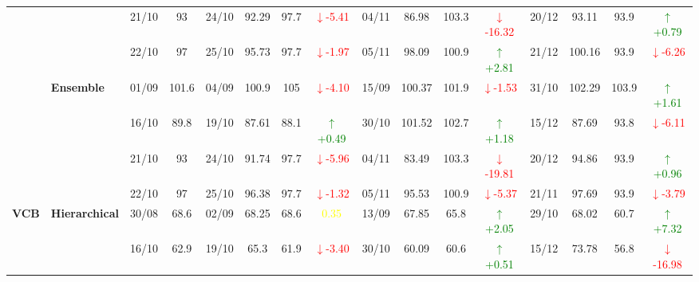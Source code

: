 \documentclass{ieeeaccess}
\begin{document}
{\begin{longtable}{llcc|cccc|cccc|cccc}
&
& 21/10 & 93 & 24/10 & 92.29 & 97.7 & \textcolor{red}{\(\downarrow\)-5.41} & 04/11 & 86.98 & 103.3 & \textcolor{red}{\(\downarrow\)-16.32} & 20/12 & 93.11 & 93.9 & \textcolor{green}{\(\uparrow\)+0.79} \\

&
& 22/10 & 97 & 25/10 & 95.73 & 97.7 & \textcolor{red}{\(\downarrow\)-1.97} & 05/11 & 98.09 & 100.9 & \textcolor{green}{\(\uparrow\)+2.81} & 21/12 & 100.16 & 93.9 & \textcolor{red}{\(\downarrow\)-6.26} \\
\cmidrule(lr){2-16}



& \textbf{Ensemble}
& 01/09 & 101.6 & 04/09 & 100.9 & 105 & \textcolor{red}{\(\downarrow\)-4.10} & 15/09 & 100.37 & 101.9 & \textcolor{red}{\(\downarrow\)-1.53} & 31/10 & 102.29 & 103.9 & \textcolor{green}{\(\uparrow\)+1.61} \\

&
& 16/10 & 89.8 & 19/10 & 87.61 & 88.1 & \textcolor{green}{\(\uparrow\)+0.49} & 30/10 & 101.52 & 102.7 & \textcolor{green}{\(\uparrow\)+1.18} & 15/12 & 87.69 & 93.8 & \textcolor{red}{\(\downarrow\)-6.11} \\

&
& 21/10 & 93 & 24/10 & 91.74 & 97.7 & \textcolor{red}{\(\downarrow\)-5.96} & 04/11 & 83.49 & 103.3 & \textcolor{red}{\(\downarrow\)-19.81} & 20/12 & 94.86 & 93.9 & \textcolor{green}{\(\uparrow\)+0.96} \\

&
& 22/10 & 97 & 25/10 & 96.38 & 97.7 & \textcolor{red}{\(\downarrow\)-1.32} & 05/11 & 95.53 & 100.9 & \textcolor{red}{\(\downarrow\)-5.37} & 21/11 & 97.69 & 93.9 & \textcolor{red}{\(\downarrow\)-3.79} \\
\midrule




\multirow{12}{*}{\textbf{VCB}} 
& \textbf{Hierarchical}
& 30/08 & 68.6 & 02/09 & 68.25 & 68.6 & \textcolor{yellow}{0.35} & 13/09 & 67.85 & 65.8 & \textcolor{green}{\(\uparrow\)+2.05} & 29/10 & 68.02 & 60.7 & \textcolor{green}{\(\uparrow\)+7.32} \\

&
& 16/10 & 62.9 & 19/10 & 65.3 & 61.9 & \textcolor{red}{\(\downarrow\)-3.40} & 30/10 & 60.09 & 60.6 & \textcolor{green}{\(\uparrow\)+0.51} & 15/12 & 73.78 & 56.8 & \textcolor{red}{\(\downarrow\)-16.98} \\


\end{longtable}}
\end{document}
